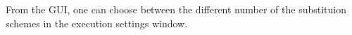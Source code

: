\documentclass[11pt,twoside,a4paper]{article}
\begin{document}


From the GUI, one can choose between the different number of the substituion schemes in the execution settings window.






%
%
%
%
%

\end{document}
